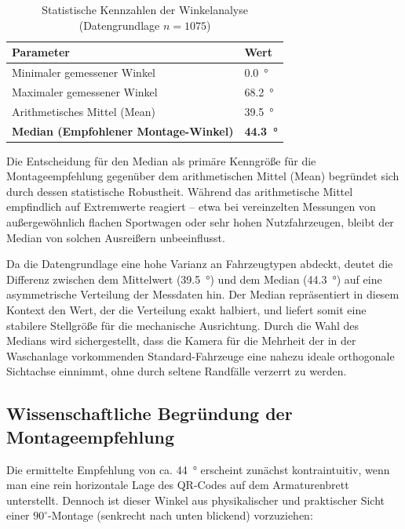 \documentclass[
    a4paper,        %
    11pt,           %
    ngerman,        %
    parskip=half,   %
    listof=totoc,   %
    bibliography=totoc %
]{scrartcl}
\begin{document}
\begin{table}[H]
    \centering
    \caption{Statistische Kennzahlen der Winkelanalyse (Datengrundlage $n=1075$)}
    \label{tab:winkel_stats}
    \begin{tabular}{l l}
        \toprule
        \textbf{Parameter} & \textbf{Wert} \\
        \midrule
        Minimaler gemessener Winkel & \SI{0,0}{\degree} \\
        Maximaler gemessener Winkel & \SI{68,2}{\degree} \\
        Arithmetisches Mittel (Mean) & \SI{39,5}{\degree} \\
        \textbf{Median (Empfohlener Montage-Winkel)} & \textbf{\SI{44,3}{\degree}} \\
        \bottomrule
    \end{tabular}
\end{table}
Die Entscheidung für den Median als primäre Kenngröße für die Montageempfehlung gegenüber dem arithmetischen Mittel (Mean) begründet sich durch dessen statistische Robustheit. Während das arithmetische Mittel empfindlich auf Extremwerte reagiert – etwa bei vereinzelten Messungen von außergewöhnlich flachen Sportwagen oder sehr hohen Nutzfahrzeugen, bleibt der Median von solchen Ausreißern unbeeinflusst. 

Da die Datengrundlage eine hohe Varianz an Fahrzeugtypen abdeckt, deutet die Differenz zwischen dem Mittelwert (\SI{39,5}{\degree}) und dem Median (\SI{44,3}{\degree}) auf eine asymmetrische Verteilung der Messdaten hin. Der Median repräsentiert in diesem Kontext den Wert, der die Verteilung exakt halbiert, und liefert somit eine stabilere Stellgröße für die mechanische Ausrichtung. Durch die Wahl des Medians wird sichergestellt, dass die Kamera für die Mehrheit der in der Waschanlage vorkommenden Standard-Fahrzeuge eine nahezu ideale orthogonale Sichtachse einnimmt, ohne durch seltene Randfälle verzerrt zu werden.

\subsection{Wissenschaftliche Begründung der Montageempfehlung}

Die ermittelte Empfehlung von ca. \SI{44}{\degree} erscheint zunächst kontraintuitiv, wenn man eine rein horizontale Lage des QR-Codes auf dem Armaturenbrett unterstellt. Dennoch ist dieser Winkel aus physikalischer und praktischer Sicht einer $90^\circ$-Montage (senkrecht nach unten blickend) vorzuziehen:
\end{document}
